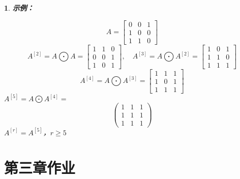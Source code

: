 \documentclass[UTF8]{report}
\theoremstyle{MyLineTheoremStyle} %
\theoremstyle{MyBlockTheoremStyle} %
\theoremstyle{MySubsubsectionStyle} %
\newtheorem{definition}{}
\begin{document}
\begin{definition}
    \textbf{示例：}\par
    \[
    A =
    \begin{bmatrix}
    0 & 0 & 1 \\
    1 & 0 & 0 \\
    1 & 1 & 0
    \end{bmatrix}
    \]
    \[
    A^{[2]} = A \bigodot  A =
    \begin{bmatrix}
    1 & 1 & 0 \\
    0 & 0 & 1 \\
    1 & 0 & 1
    \end{bmatrix}
    , \quad
    A^{[3]} = A \bigodot  A^{[2]} =
    \begin{bmatrix}
    1 & 0 & 1 \\
    1 & 1 & 0 \\
    1 & 1 & 1
    \end{bmatrix}
    \]
    \[
    A^{[4]} = A \bigodot  A^{[3]} =
    \begin{bmatrix}
    1 & 1 & 1 \\
    1 & 0 & 1 \\
    1 & 1 & 1
    \end{bmatrix}
\]
$A^{[5]} = A \bigodot  A^{[4]} =$
\[
\begin{pmatrix}
1 & 1 & 1 \\
1 & 1 & 1 \\
1 & 1 & 1
\end{pmatrix}
\]
$A^{[r]} = A^{[5]}$，$r \geq 5$
\end{definition}






\chapter{第三章作业}\thispagestyle{fancy}
\end{document}
